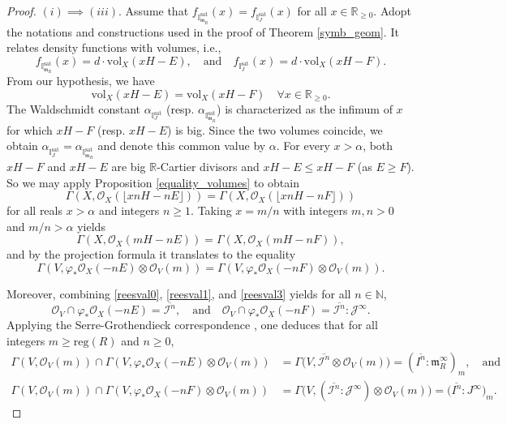 \documentclass[12pt,a4paper]{amsart}
\theoremstyle{plain}
\theoremstyle{definition}
\numberwithin{equation}{theorem}
\begin{document}
\begin{proof}
$(i)\implies (iii)$. Assume that $f_{\mathbb{I}^{\mathrm{sat}}_{\mathfrak{m}_R}}(x) = f_{\mathbb{I}^{\mathrm{sat}}_{J}}(x)$ for all $x\in\mathbb{R}_{\geq 0}$. Adopt the notations and constructions used in the proof of Theorem \ref{symb_geom}. It relates density functions with volumes, i.e., $$f_{\mathbb{I}^{\mathrm{sat}}_{\mathfrak{m}_R}}(x) = d\cdot\mathrm{vol}_X(xH-E), \quad \text{and} \quad f_{\mathbb{I}^{\mathrm{sat}}_{J}}(x) = d\cdot\mathrm{vol}_X(xH-F).$$ From our hypothesis, we have $$\mathrm{vol}_X(xH-E) = \mathrm{vol}_X(xH-F)\quad \forall x\in\mathbb{R}_{\geq 0}.$$ The Waldschmidt constant $\alpha_{\mathbb{I}^{\mathrm{sat}}_{J}}$ (resp. $\alpha_{\mathbb{I}^{\mathrm{sat}}_{\mathfrak{m}_R}}$) is characterized as the infimum of $x$ for which $xH-F$ (resp. $xH-E$) is big. Since the two volumes coincide, we obtain $\alpha_{\mathbb{I}^{\mathrm{sat}}_{J}} = \alpha_{\mathbb{I}^{\mathrm{sat}}_{\mathfrak{m}_R}}$ and denote this common value by $\alpha$. For every $x>\alpha$, both $xH-F$ and $xH-E$ are big  $\mathbb{R}$-Cartier divisors and $xH-E \leq xH-F$ (as $E\geq F$). So we may apply Proposition \ref{equality_volumes} to obtain $$\Gamma\left(X,\mathcal{O}_X\left(\lfloor xnH-nE\rfloor \right)\right) = \Gamma\left(X,\mathcal{O}_X\left(\lfloor xnH-nF\rfloor\right)\right)$$ for all reals $x>\alpha$ and integers $n\geq 1$. Taking $x = m/n$ with integers $m, n > 0$ and $m/n > \alpha$ yields $$\Gamma\left(X,\mathcal{O}_X\left(mH-nE\right)\right) = \Gamma\left(X,\mathcal{O}_X\left(mH-nF\right)\right),$$ and by the projection formula it translates to the equality $$\Gamma\left(V,\varphi_*\mathcal{O}_X(-nE)\otimes \mathcal{O}_V(m)\right) = \Gamma\left(V,\varphi_*\mathcal{O}_X(-nF)\otimes \mathcal{O}_V(m)\right).$$

Moreover, combining \eqref{reesval0}, \eqref{reesval1}, and \eqref{reesval3} yields for all $n\in \mathbb{N}$, $$\mathcal{O}_V \cap \varphi_*\mathcal{O}_X(-nE) = \overline{\mathcal{I}^n},\quad \text{and}\quad \mathcal{O}_V \cap \varphi_*\mathcal{O}_X(-nF) = \overline{\mathcal{I}^n}\colon \mathcal{J}^{\infty}.$$ Applying the Serre-Grothendieck correspondence \cite[Proposition 2.2]{Har67}, one deduces that for all integers $m\geq \mathrm{reg}(R)$ and $n\geq 0$,
\begin{align*}
\Gamma\left(V,\mathcal{O}_V(m)\right) \cap \Gamma\left(V,\varphi_*\mathcal{O}_X(-nE)\otimes \mathcal{O}_V(m)\right) &= \Gamma \big(V,\overline{\mathcal{I}^n}\otimes \mathcal{O}_V(m)\big) = {(\overline{I^n} \colon \mathfrak{m}_R^{\infty})}_m,\quad \text{and}\\
\Gamma\left(V,\mathcal{O}_V(m)\right) \cap \Gamma\left(V,\varphi_*\mathcal{O}_X(-nF)\otimes \mathcal{O}_V(m)\right) &= \Gamma \big(V,(\overline{\mathcal{I}^n}\colon \mathcal{J}^{\infty})\otimes \mathcal{O}_V(m)\big) = \big(\overline{I^n} : J^{\infty}\big)_m.
\end{align*}


\end{proof}
\end{document}
